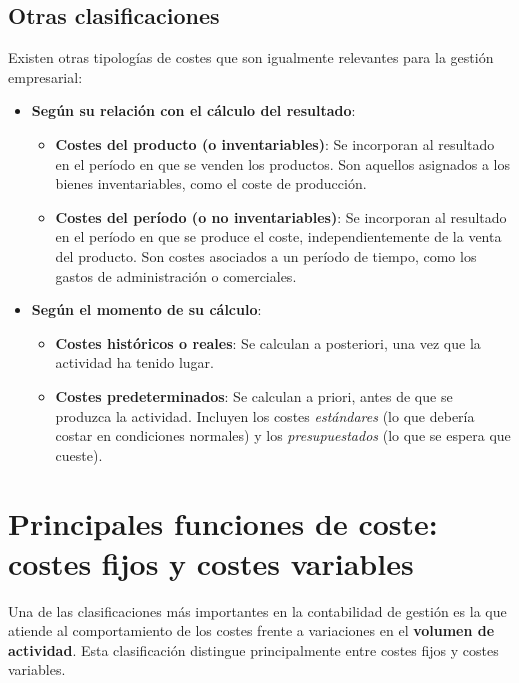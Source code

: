 \subsection{Otras clasificaciones}
Existen otras tipologías de costes que son igualmente relevantes para la gestión empresarial:
\begin{itemize}
    \item \textbf{Según su relación con el cálculo del resultado}:
    \begin{itemize}
        \item \textbf{Costes del producto (o inventariables)}: Se incorporan al resultado en el período en que se venden los productos. Son aquellos asignados a los bienes inventariables, como el coste de producción.
        \item \textbf{Costes del período (o no inventariables)}: Se incorporan al resultado en el período en que se produce el coste, independientemente de la venta del producto. Son costes asociados a un período de tiempo, como los gastos de administración o comerciales.
    \end{itemize}
    \item \textbf{Según el momento de su cálculo}:
    \begin{itemize}
        \item \textbf{Costes históricos o reales}: Se calculan a posteriori, una vez que la actividad ha tenido lugar.
        \item \textbf{Costes predeterminados}: Se calculan a priori, antes de que se produzca la actividad. Incluyen los costes \textit{estándares} (lo que debería costar en condiciones normales) y los \textit{presupuestados} (lo que se espera que cueste).
    \end{itemize}
\end{itemize}

\section{Principales funciones de coste: costes fijos y costes variables}

Una de las clasificaciones más importantes en la contabilidad de gestión es la que atiende al comportamiento de los costes frente a variaciones en el \textbf{volumen de actividad}. Esta clasificación distingue principalmente entre costes fijos y costes variables.

